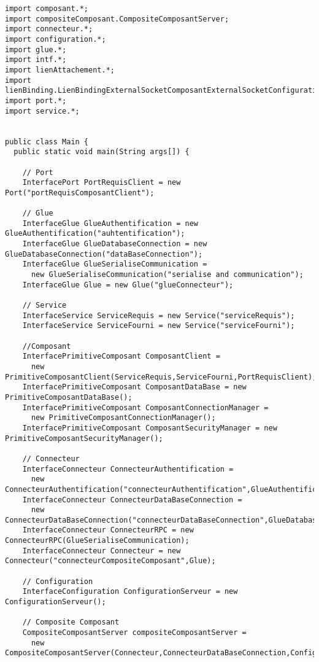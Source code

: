 \documentclass[11pt, a4paper, notitlepage]{article}
\begin{document}
\begin{lstlisting}
import composant.*;
import compositeComposant.CompositeComposantServer;
import connecteur.*;
import configuration.*;
import glue.*;
import intf.*;
import lienAttachement.*;
import lienBinding.LienBindingExternalSocketComposantExternalSocketConfiguration;
import port.*;
import service.*;


public class Main {
  public static void main(String args[]) {

    // Port
    InterfacePort PortRequisClient = new Port("portRequisComposantClient");

    // Glue
    InterfaceGlue GlueAuthentification = new GlueAuthentification("auhtentification");
    InterfaceGlue GlueDatabaseConnection = new GlueDatabaseConnection("dataBaseConnection");
    InterfaceGlue GlueSerialiseCommunication =
      new GlueSerialiseCommunication("serialise and communication");
    InterfaceGlue Glue = new Glue("glueConnecteur");

    // Service
    InterfaceService ServiceRequis = new Service("serviceRequis");
    InterfaceService ServiceFourni = new Service("serviceFourni");

    //Composant
    InterfacePrimitiveComposant ComposantClient =
      new PrimitiveComposantClient(ServiceRequis,ServiceFourni,PortRequisClient);
    InterfacePrimitiveComposant ComposantDataBase = new PrimitiveComposantDataBase();
    InterfacePrimitiveComposant ComposantConnectionManager =
      new PrimitiveComposantConnectionManager();
    InterfacePrimitiveComposant ComposantSecurityManager = new PrimitiveComposantSecurityManager();

    // Connecteur
    InterfaceConnecteur ConnecteurAuthentification =
      new ConnecteurAuthentification("connecteurAuthentification",GlueAuthentification);
    InterfaceConnecteur ConnecteurDataBaseConnection =
      new ConnecteurDataBaseConnection("connecteurDataBaseConnection",GlueDatabaseConnection);
    InterfaceConnecteur ConnecteurRPC = new ConnecteurRPC(GlueSerialiseCommunication);
    InterfaceConnecteur Connecteur = new Connecteur("connecteurCompositeComposant",Glue);

    // Configuration
    InterfaceConfiguration ConfigurationServeur = new ConfigurationServeur();

    // Composite Composant
    CompositeComposantServer compositeComposantServer =
      new CompositeComposantServer(Connecteur,ConnecteurDataBaseConnection,ConfigurationServeur);


\end{lstlisting}
\end{document}
